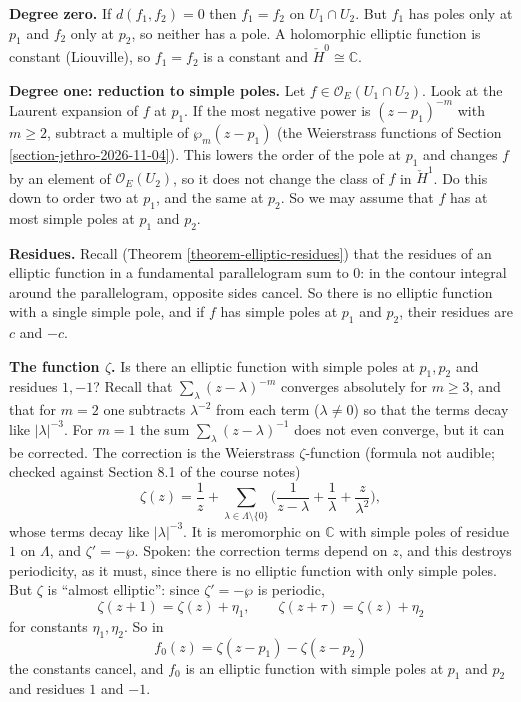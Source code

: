 \medskip\noindent
{\bf Degree zero.} If $d(f_1,f_2)=0$ then
$f_1=f_2$ on $U_1\cap U_2$. But $f_1$ has
poles only at $p_1$ and $f_2$ only at $p_2$,
so neither has a pole. A holomorphic elliptic
function is constant (Liouville), so
$f_1=f_2$ is a constant and
$\check{H}^0\cong\mathbb{C}$.

\medskip\noindent
{\bf Degree one: reduction to simple poles.}
Let $f\in\mathcal{O}_E(U_1\cap U_2)$. Look at
the Laurent expansion of $f$ at $p_1$. If the
most negative power is $(z-p_1)^{-m}$ with
$m\geq 2$, subtract a multiple of
$\wp_m(z-p_1)$ (the Weierstrass functions of
Section \ref{section-jethro-2026-11-04}).
This
lowers the order of the pole at $p_1$ and
changes $f$ by an element of
$\mathcal{O}_E(U_2)$, so it does not change
the class of $f$ in $\check{H}^1$. Do this
down to order two at $p_1$, and the same at
$p_2$. So we may assume that $f$ has at most
simple poles at $p_1$ and $p_2$.

\medskip\noindent
{\bf Residues.} Recall (Theorem
\ref{theorem-elliptic-residues}) that the
residues of an elliptic function in a
fundamental parallelogram sum to $0$: in the
contour integral around the parallelogram,
opposite sides cancel. So there is no
elliptic function with a single simple pole,
and if $f$ has simple poles at $p_1$ and
$p_2$, their residues are $c$ and $-c$.

\medskip\noindent
{\bf The function $\zeta$.} Is there an
elliptic function with simple poles at
$p_1,p_2$ and residues $1,-1$? Recall that
$\sum_\lambda (z-\lambda)^{-m}$ converges
absolutely for $m\geq 3$, and that for $m=2$
one subtracts $\lambda^{-2}$ from each term
($\lambda\neq 0$) so that the terms decay
like $|\lambda|^{-3}$. For $m=1$ the sum
$\sum_\lambda (z-\lambda)^{-1}$ does not even
converge, but it can be corrected. The
correction is the Weierstrass
$\zeta$-function (formula not audible;
checked against Section 8.1 of the course
notes)
$$
\zeta(z)=\frac{1}{z}
+\sum_{\lambda\in\Lambda\setminus\{0\}}
\Big(\frac{1}{z-\lambda}+\frac{1}{\lambda}
+\frac{z}{\lambda^2}\Big),
$$
whose terms decay like $|\lambda|^{-3}$. It
is meromorphic on $\mathbb{C}$ with simple
poles of residue $1$ on $\Lambda$, and
$\zeta'=-\wp$. Spoken: the correction
terms depend on $z$, and this destroys
periodicity, as it must, since there is no
elliptic function with only simple poles.
But $\zeta$ is ``almost elliptic'': since
$\zeta'=-\wp$ is periodic,
$$
\zeta(z+1)=\zeta(z)+\eta_1,
\qquad
\zeta(z+\tau)=\zeta(z)+\eta_2
$$
for constants $\eta_1,\eta_2$. So in
$$
f_0(z)=\zeta(z-p_1)-\zeta(z-p_2)
$$
the constants cancel, and $f_0$ is an
elliptic function with simple poles at $p_1$
and $p_2$ and residues $1$ and $-1$.

